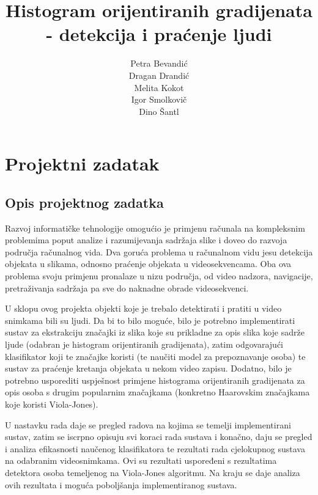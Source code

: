 \documentclass[times, utf8, seminar, numeric]{fer}
\begin{document}
\title{Histogram orijentiranih gradijenata - detekcija i praćenje ljudi}

\author{Petra Bevandić \\ Dragan Drandić \\ Melita Kokot \\ Igor Smolkovič \\ Dino Šantl}

\maketitle

\tableofcontents

\chapter{Projektni zadatak}
\section{Opis projektnog zadatka}
Razvoj informatičke tehnologije omogućio je primjenu računala na kompleksnim problemima poput analize i razumijevanja sadržaja slike i doveo do razvoja područja računalnog vida. Dva goruća problema u računalnom vidu jesu detekcija objekata u slikama, odnosno praćenje objekata u videosekvencama. Oba ova problema svoju primjenu pronalaze u nizu područja, od video nadzora, navigacije, pretraživanja sadržaja pa sve do naknadne obrade videosekvenci.

U sklopu ovog projekta objekti koje je trebalo detektirati i pratiti u video snimkama bili su ljudi. Da bi to bilo moguće, bilo je potrebno implementirati sustav za ekstrakciju značajki iz slika koje su prikladne za opis slika koje sadrže ljude (odabran je histogram orijentiranih gradijenata), zatim odgovarajući klasifikator koji te značajke koristi (te naučiti model za prepoznavanje osoba) te sustav za praćenje kretanja objekata u nekom video zapisu.  Dodatno, bilo je potrebno usporediti uspješnost primjene histograma orijentiranih gradijenata za opis osoba s drugim popularnim značajkama (konkretno Haarovskim značajkama koje koristi Viola-Jones).

U nastavku rada daje se pregled radova na kojima se temelji implementirani sustav, zatim  se iscrpno opisuju svi koraci rada sustava i konačno, daju se pregled i analiza efikasnosti naučenog klasifikatora te rezultati rada cjelokupnog sustava na odabranim videosnimkama.  Ovi su rezultati uspoređeni s rezultatima detektora osoba temeljenog na Viola-Jones algoritmu. Na kraju se daje analiza ovih rezultata i moguća poboljšanja implementiranog sustava.
\end{document}
